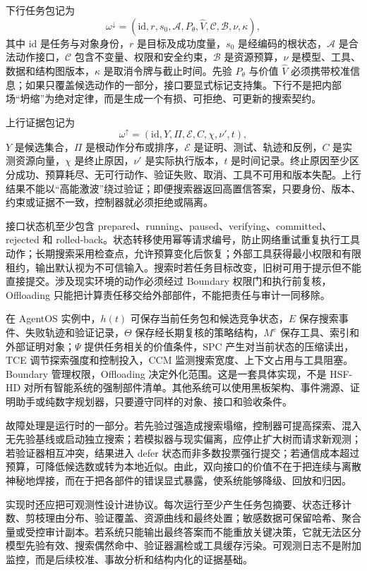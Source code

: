 下行任务包记为
\[
\omega^{\downarrow}=(\mathrm{id},r,s_0,\mathcal{A},P_{\theta},\widehat V,
\mathcal{C},\mathcal{B},\nu,\kappa),
\]
其中 $\mathrm{id}$ 是任务与对象身份，$r$ 是目标及成功度量，$s_0$ 是经编码的根状态，$\mathcal{A}$ 是合法动作接口，$\mathcal{C}$ 包含不变量、权限和安全约束，$\mathcal{B}$ 是资源预算，$\nu$ 是模型、工具、数据和结构图版本，$\kappa$ 是取消令牌与截止时间。先验 $P_{\theta}$ 与价值 $\widehat V$ 必须携带校准信息；如果只覆盖候选动作的一部分，接口要显式标记支持集。下行不是把内部场“坍缩”为绝对定律，而是生成一个有损、可拒绝、可更新的搜索契约。

上行证据包记为
\[
\omega^{\uparrow}=(\mathrm{id},Y,\Pi,\mathcal{E},C,\chi,\nu',t),
\]
$Y$ 是候选集合，$\Pi$ 是根动作分布或排序，$\mathcal{E}$ 是证明、测试、轨迹和反例，$C$ 是实测资源向量，$\chi$ 是终止原因，$\nu'$ 是实际执行版本，$t$ 是时间记录。终止原因至少区分成功、预算耗尽、无可行动作、验证失败、取消、工具不可用和版本失配。上行结果不能以“高能激波”绕过验证；即便搜索器返回高置信答案，只要身份、版本、约束或证据不一致，控制器就必须拒绝或隔离。

接口状态机至少包含 prepared、running、paused、verifying、committed、rejected 和 rolled-back。状态转移使用幂等请求编号，防止网络重试重复执行工具动作；长期搜索采用检查点，允许预算变化后恢复；外部工具获得最小权限和有限租约，输出默认视为不可信输入。搜索时若任务目标改变，旧树可用于提示但不能直接提交。涉及现实环境的动作必须经过 Boundary 权限门和执行前复核，Offloading 只能把计算责任移交给外部部件，不能把责任与审计一同移除。

在 AgentOS 实例中，$h(t)$ 可保存当前任务包和候选竞争状态，$E$ 保存搜索事件、失败轨迹和验证记录，$\Theta$ 保存经长期复核的策略结构，$M^e$ 保存工具、索引和外部证明对象；$\Psi$ 提供任务相关的价值条件，SPC 产生对当前状态的压缩读出，TCE 调节探索强度和控制投入，CCM 监测搜索宽度、上下文占用与工具阻塞。Boundary 管理权限，Offloading 决定外化范围。这是一套具体实现，不是 HSF-HD 对所有智能系统的强制部件清单。其他系统可以使用黑板架构、事件溯源、证明助手或纯数字规划器，只要遵守同样的对象、接口和验收条件。

故障处理是运行时的一部分。若先验过强造成搜索塌缩，控制器可提高探索、混入无先验基线或启动独立搜索；若模拟器与现实偏离，应停止扩大树而请求新观测；若验证器相互冲突，结果进入 defer 状态而非多数投票强行提交；若通信成本超过预算，可降低候选数或转为本地近似。由此，双向接口的价值不在于把连续与离散神秘地焊接，而在于把各部件的错误显式暴露，使系统能够降级、回放和归因。

实现时还应把可观测性设计进协议。每次运行至少产生任务包摘要、状态迁移计数、剪枝理由分布、验证覆盖、资源曲线和最终处置；敏感数据可保留哈希、聚合量或受控审计副本。若系统只能输出最终答案而不能重放关键决策，它就无法区分模型先验有效、搜索偶然命中、验证器漏检或工具缓存污染。可观测日志不是附加监控，而是后续校准、事故分析和结构内化的证据基础。

